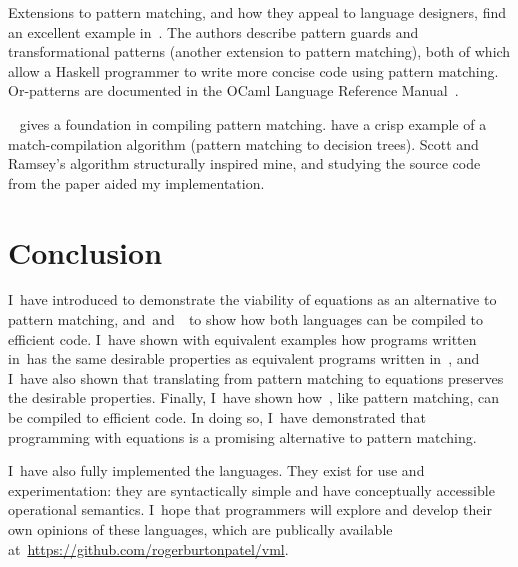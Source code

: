\documentclass[manuscript,screen 12pt, nonacm]{acmart}
\begin{document}
    Extensions to pattern matching, and how they appeal to language designers,
    find an excellent example in~\citet{guardproposal}. The authors describe
    pattern guards and transformational patterns (another extension to pattern
    matching), both of which allow a Haskell programmer to write more concise
    code using pattern matching. Or-patterns are documented in the OCaml
    Language Reference Manual~\citep{ocaml}.
    
    \citet{augustsson1985compiling}~ gives a foundation in compiling pattern
    matching. \citet{scottramsey} have a crisp example of a match-compilation
    algorithm (pattern matching to decision trees). Scott and Ramsey's algorithm
    structurally inspired mine, and studying the source code from the paper
    aided my implementation. 
    
    
    \section{Conclusion}

    I~have introduced \VMinus to demonstrate the viability of equations as an
    alternative to pattern matching, and~\D and~\DTran\ to show how both
    languages can be compiled to efficient code. I~have shown with equivalent
    examples how programs written in~\VMinus has the same desirable properties
    as equivalent programs written in~\PPlus, and I~have also shown that
    translating from pattern matching to equations preserves the desirable
    properties. Finally, I~have shown how~\VMinus, like pattern matching, can be
    compiled to efficient code. In doing so, I~have demonstrated that
    programming with equations is a promising alternative to pattern matching. 

    I~have also fully implemented the languages. They exist for use and
    experimentation: they are syntactically simple and have conceptually
    accessible operational semantics. I~hope that programmers will explore and
    develop their own opinions of these languages, which are publically
    available at~\url{https://github.com/rogerburtonpatel/vml}. 

    
    
\end{document}
